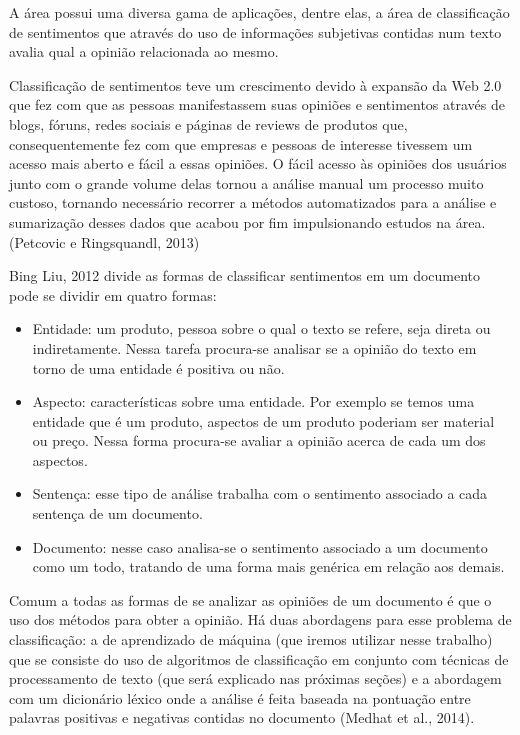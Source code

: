 A área possui uma diversa gama de aplicações, dentre elas, a área de classificação de sentimentos
que através do uso de informações subjetivas contidas num texto avalia qual a opinião relacionada
ao mesmo.

Classificação de sentimentos teve um crescimento devido à expansão da Web 2.0 que fez com que
as pessoas manifestassem suas opiniões e sentimentos através de blogs, fóruns, redes sociais
e páginas de reviews de produtos que, consequentemente fez com que empresas e pessoas de interesse
tivessem um acesso mais aberto e fácil a essas opiniões. O fácil acesso às opiniões dos usuários
junto com o grande volume delas tornou a análise manual um processo muito custoso, tornando
necessário recorrer a métodos automatizados para a análise e sumarização desses dados que
acabou por fim impulsionando estudos na área. (Petcovic e Ringsquandl, 2013)

Bing Liu, 2012\cite{bingliu2012} divide as formas de classificar sentimentos 
em um documento pode se dividir em quatro formas:
\begin{itemize}
	\item Entidade:  um produto, pessoa sobre o qual o texto se refere, seja direta ou indiretamente.
	Nessa tarefa procura-se analisar se a opinião do texto em torno de uma entidade é positiva ou
	não.
	\item Aspecto: características sobre uma entidade. Por exemplo se temos uma entidade que é um
	produto, aspectos de um produto poderiam ser material ou preço. Nessa forma procura-se avaliar
	a opinião acerca de cada um dos aspectos.
	\item Sentença: esse tipo de análise trabalha com o sentimento associado a cada sentença de
	um documento.
	\item Documento: nesse caso analisa-se o sentimento associado a um documento como um todo, 
	tratando de uma forma mais genérica em relação aos demais.
\end{itemize}

Comum a todas as formas de se analizar as opiniões de um documento é que o uso dos métodos
para obter a opinião. Há duas abordagens para esse problema de classificação: a de aprendizado
de máquina (que iremos utilizar nesse trabalho) que se consiste do uso de algoritmos de 
classificação em conjunto com técnicas de processamento de texto (que será explicado nas próximas
seções) e a abordagem com um dicionário léxico onde a análise é feita baseada na pontuação
entre palavras positivas e negativas contidas no documento (Medhat et al., 2014).

